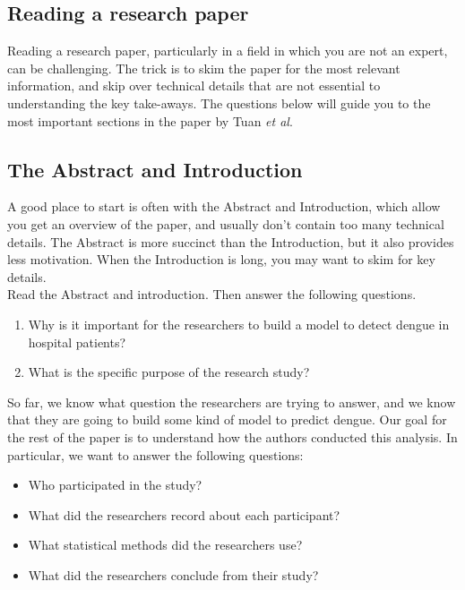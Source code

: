 \documentclass[11pt]{article}
\begin{document}
\subsection*{Reading a research paper}

Reading a research paper, particularly in a field in which you are not an expert, can be challenging. The trick is to skim the paper for the most relevant information, and skip over technical details that are not essential to understanding the key take-aways. The questions below will guide you to the most important sections in the paper by Tuan \textit{et al}.


\subsection*{The Abstract and Introduction}

A good place to start is often with the Abstract and Introduction, which allow you get an overview of the paper, and usually don't contain too many technical details. The Abstract is more succinct than the Introduction, but it also provides less motivation. When the Introduction is long, you may want to skim for key details.\\

\noindent Read the Abstract and introduction. Then answer the following questions.

\begin{enumerate}
    \item Why is it important for the researchers to build a model to detect dengue in hospital patients?
    
    \item What is the specific purpose of the research study?
\end{enumerate}

\noindent So far, we know what question the researchers are trying to answer, and we know that they are going to build some kind of model to predict dengue. Our goal for the rest of the paper is to understand how the authors conducted this analysis. In particular, we want to answer the following questions:

\begin{itemize}
\item Who participated in the study?
\item What did the researchers record about each participant?
\item What statistical methods did the researchers use?
\item What did the researchers conclude from their study?
\end{itemize}
\end{document}
